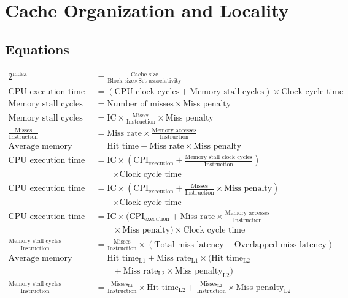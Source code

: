 \section{Cache Organization and Locality}\label{sec:caches}

\subsection*{Equations}
\begin{align*}
2^{\text{index}}&=\frac{\text{Cache size}}{\text{Block size} \times \text{Set associativity}} \\
\text{CPU execution time}&=(\text{CPU clock cycles} + \text{Memory stall cycles}) \times \text{Clock cycle time} \\
\text{Memory stall cycles}&=\text{Number of misses} \times \text{Miss penalty} \\
\text{Memory stall cycles}&=\text{IC} \times \frac{\text{Misses}}{\text{Instruction}} \times \text{Miss penalty} \\
\frac{\text{Misses}}{\text{Instruction}}&=\text{Miss rate} \times \frac{\text{Memory accesses}}{\text{Instruction}} \\
\text{Average memory access time}&=\text{Hit time} + \text{Miss rate} \times \text{Miss penalty} \\
\text{CPU execution time}&=\text{IC} \times \left(\text{CPI}_{\text{execution}} + \frac{\text{Memory stall clock cycles}}{\text{Instruction}}\right) \\
&\qquad \times \text{Clock cycle time} \\
\text{CPU execution time}&=\text{IC} \times \left(\text{CPI}_{\text{execution}} + \frac{\text{Misses}}{\text{Instruction}} \times \text{Miss penalty}\right) \\
&\qquad \times \text{Clock cycle time} \\
\text{CPU execution time}&=\text{IC} \times \biggl(\text{CPI}_{\text{execution}} + \text{Miss rate} \times \frac{\text{Memory accesses}}{\text{Instruction}} \\
&\qquad \times \text{Miss penalty}\biggr) \times \text{Clock cycle time} \\
\frac{\text{Memory stall cycles}}{\text{Instruction}}&=\frac{\text{Misses}}{\text{Instruction}} \times (\text{Total miss latency} - \text{Overlapped miss latency}) \\
\text{Average memory access time}&=\text{Hit time}_{\text{L1}} + \text{Miss rate}_{\text{L1}} \times (\text{Hit time}_{\text{L2}} \\
&\qquad + \text{Miss rate}_{\text{L2}} \times \text{Miss penalty}_{\text{L2}}) \\
\frac{\text{Memory stall cycles}}{\text{Instruction}}&=\frac{\text{Misses}_{\text{L1}}}{\text{Instruction}} \times \text{Hit time}_{\text{L2}} + \frac{\text{Misses}_{\text{L2}}}{\text{Instruction}} \times \text{Miss penalty}_{\text{L2}}
\end{align*}

